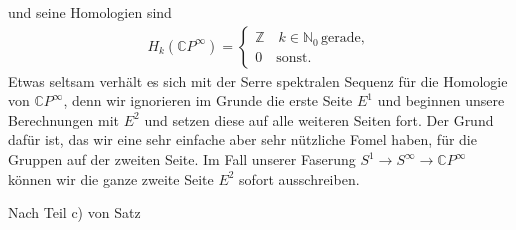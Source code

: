 \documentclass[12pt, hidelinks]{article}
\numberwithin{conj}{section}
\begin{document}
und seine Homologien sind
\begin{align}
H_k(\mathbb{C}P^\infty) = \begin{cases}
\mathbb{Z} \quad k \in \mathbb{N}_0 \, \text{gerade},\\
0 \quad \text{sonst.}
\end{cases}
\end{align}
Etwas seltsam verhält es sich mit der Serre spektralen Sequenz für die Homologie von $\mathbb{C}P^\infty$, denn wir ignorieren im Grunde die erste Seite $E^1$ und beginnen unsere Berechnungen mit $E^2$ und setzen diese auf alle weiteren Seiten fort. Der Grund dafür ist, das wir eine sehr einfache aber sehr nützliche Fomel haben, für die Gruppen auf der zweiten Seite. Im Fall unserer Faserung $S^1 \to S^\infty \to \mathbb{C}P^\infty$ können wir die ganze zweite Seite $E^2$ sofort ausschreiben.

Nach Teil c) von Satz 
\nocite{*}
\printbibliography
\end{document}

